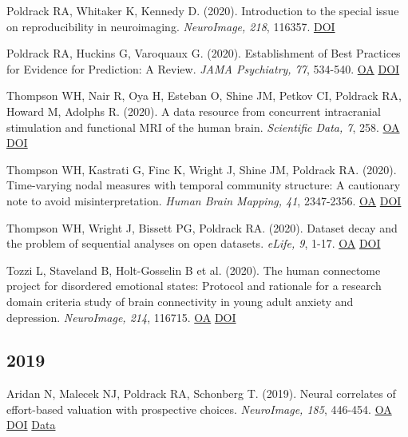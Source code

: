 \documentclass[10pt, letterpaper]{article}
\begin{document}
Poldrack RA, Whitaker K, Kennedy D.  (2020). Introduction to the special issue on reproducibility in neuroimaging. \textit{NeuroImage, 218}, 116357. \href{https://doi.org/10.1016/j.neuroimage.2019.116357}{DOI} \vspace{2mm}

Poldrack RA, Huckins G, Varoquaux G.  (2020). Establishment of Best Practices for Evidence for Prediction: A Review. \textit{JAMA Psychiatry, 77}, 534-540. \href{https://www.ncbi.nlm.nih.gov/pmc/articles/PMC7250718}{OA} \href{https://doi.org/10.1001/jamapsychiatry.2019.3671}{DOI} \vspace{2mm}

Thompson WH, Nair R, Oya H, Esteban O, Shine JM, Petkov CI, Poldrack RA, Howard M, Adolphs R.  (2020). A data resource from concurrent intracranial stimulation and functional MRI of the human brain. \textit{Scientific Data, 7}, 258. \href{https://www.ncbi.nlm.nih.gov/pmc/articles/PMC7406507}{OA} \href{https://doi.org/10.1038/s41597-020-00595-y}{DOI} \vspace{2mm}

Thompson WH, Kastrati G, Finc K, Wright J, Shine JM, Poldrack RA.  (2020). Time-varying nodal measures with temporal community structure: A cautionary note to avoid misinterpretation. \textit{Human Brain Mapping, 41}, 2347-2356. \href{https://www.ncbi.nlm.nih.gov/pmc/articles/PMC7268033}{OA} \href{https://doi.org/10.1002/hbm.24950}{DOI} \vspace{2mm}

Thompson WH, Wright J, Bissett PG, Poldrack RA.  (2020). Dataset decay and the problem of sequential analyses on open datasets. \textit{eLife, 9}, 1-17. \href{https://www.ncbi.nlm.nih.gov/pmc/articles/PMC7237204}{OA} \href{https://doi.org/10.7554/elife.53498}{DOI} \vspace{2mm}

Tozzi L, Staveland B, Holt-Gosselin B et al. (2020). The human connectome project for disordered emotional states: Protocol and rationale for a research domain criteria study of brain connectivity in young adult anxiety and depression. \textit{NeuroImage, 214}, 116715. \href{https://www.ncbi.nlm.nih.gov/pmc/articles/PMC8597395}{OA} \href{https://doi.org/10.1016/j.neuroimage.2020.116715}{DOI} \vspace{2mm}

\subsection*{2019}Aridan N, Malecek NJ, Poldrack RA, Schonberg T.  (2019). Neural correlates of effort-based valuation with prospective choices. \textit{NeuroImage, 185}, 446-454. \href{https://www.ncbi.nlm.nih.gov/pmc/articles/PMC6289638}{OA} \href{https://doi.org/10.1016/j.neuroimage.2018.10.051}{DOI} \href{https://openneuro.org/datasets/ds001167/versions/00002}{Data} \vspace{2mm}
\end{document}
